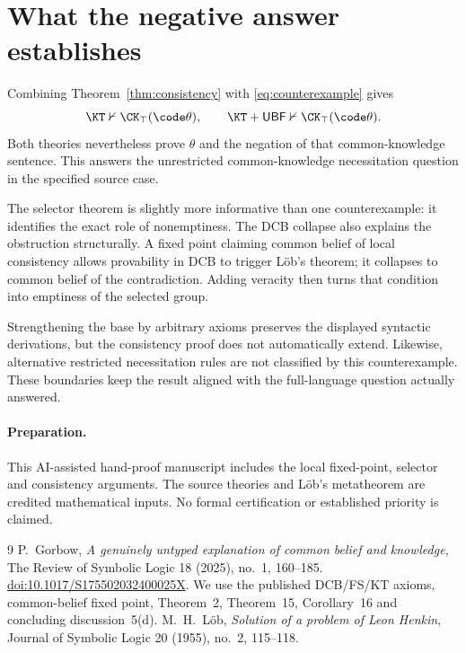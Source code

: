 \documentclass[11pt]{article}
\begin{document}
\section{What the negative answer establishes}

Combining Theorem~\ref{thm:consistency} with
\eqref{eq:counterexample} gives
\[
 \KT\nvdash\CK_\top(\code\theta),
 \qquad
 \KT+\mathsf{UBF}\nvdash\CK_\top(\code\theta).
\]
Both theories nevertheless prove $\theta$ and the negation of that
common-knowledge sentence. This answers the unrestricted
common-knowledge necessitation question in the specified source case.

The selector theorem is slightly more informative than one
counterexample: it identifies the exact role of nonemptiness. The
DCB collapse also explains the obstruction structurally. A fixed point
claiming common belief of local consistency allows provability in DCB
to trigger L\"ob's theorem; it collapses to common belief of the
contradiction. Adding veracity then turns that condition into emptiness
of the selected group.

Strengthening the base by arbitrary axioms preserves the displayed
syntactic derivations, but the consistency proof does not automatically
extend. Likewise, alternative restricted necessitation rules are not
classified by this counterexample. These boundaries keep the result
aligned with the full-language question actually answered.

\paragraph{Preparation.}
This AI-assisted hand-proof manuscript includes the local fixed-point,
selector and consistency arguments. The source theories and L\"ob's
metatheorem are credited mathematical inputs. No formal certification
or established priority is claimed.

\begin{thebibliography}{9}
 P.~Gorbow,
\emph{A genuinely untyped explanation of common belief and knowledge},
The Review of Symbolic Logic 18 (2025), no.~1, 160--185.
\href{https://doi.org/10.1017/S175502032400025X}{doi:10.1017/S175502032400025X}.
We use the published DCB/FS/KT axioms, common-belief fixed point,
Theorem~2, Theorem~15, Corollary~16 and concluding discussion~5(d).
 M.~H.~L\"ob,
\emph{Solution of a problem of Leon Henkin},
Journal of Symbolic Logic 20 (1955), no.~2, 115--118.
\end{thebibliography}
\end{document}
